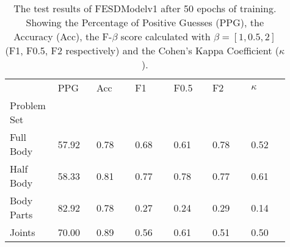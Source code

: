    \begin{table}[!htbp]
        \caption[Test Results of FESDModelv1]{The test results of FESDModelv1 after 50 epochs of training. Showing the Percentage of Positive Guesses (PPG), the Accuracy (Acc), the F-$\beta$ score calculated with $\beta = [1, 0.5, 2]$ (F1, F0.5, F2 respectively) and the Cohen's Kappa Coefficient ($\kappa$).}
        \label{tab:res_v1}
        \begin{tabular}{p{0.13\linewidth}p{0.13\linewidth}p{0.13\linewidth}p{0.13\linewidth}p{0.13\linewidth}p{0.13\linewidth}p{0.13\linewidth}}
\hline
{} &   PPG &  Acc &   F1 &  F0.5 &   F2 &  $\kappa$ \\
Problem Set   &       &      &      &       &      &           \\
\hline
Full Body  & 57.92 & 0.78 & 0.68 &  0.61 & 0.78 &      0.52 \\
Half Body  & 58.33 & 0.81 & 0.77 &  0.78 & 0.77 &      0.61 \\
Body Parts & 82.92 & 0.78 & 0.27 &  0.24 & 0.29 &      0.14 \\
Joints     & 70.00 & 0.89 & 0.56 &  0.61 & 0.51 &      0.50 \\
\hline
\end{tabular}

    \end{table}
  